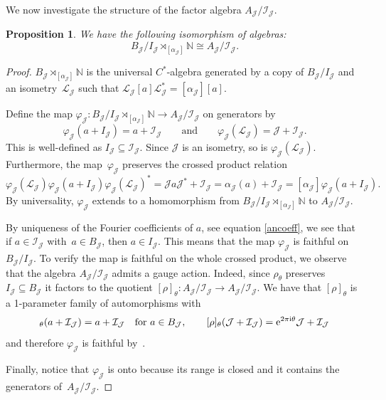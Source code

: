\documentclass[10pt,a4paper]{amsart}
\newcommand{\N}{{\mathbb N}}
\newcommand{\fancyI}{\mathcal{I}}
\newcommand{\fancyJ}{\mathcal{J}}
\newcommand{\fancyL}{\mathcal{L}}
\numberwithin{equation}{section}
\newtheorem{Proposition}[Theorem]{Proposition}
 { \theoremstyle{definition}
\newtheorem{Definition}[Theorem]{Definition}
\newtheorem{Note}[Theorem]{Note}
\newtheorem{Example}[Theorem]{Example}
\newtheorem{Remark}[Theorem]{Remark} }
\begin{document}
We now investigate the structure of the factor algebra $A_\fancyJ/\fancyI_\fancyJ$.
\begin{Proposition}\label{FactorCross}
We have the following isomorphism of algebras:
\begin{equation*}
B_\fancyJ/I_\fancyJ \rtimes_{[\alpha_\fancyJ]} \N \cong A_\fancyJ/\fancyI_\fancyJ.
\end{equation*}
\end{Proposition}
\begin{proof}
$B_\fancyJ \rtimes_{[\alpha_\fancyJ]} \N$ is the universal $C^*$-algebra generated by a copy of $B_\fancyJ/I_\fancyJ$ and an isometry~$\fancyL_\fancyJ$ such that
$
\fancyL_\fancyJ[a]\fancyL_\fancyJ^* = [\alpha_\fancyJ][a]$.


Define the map $\varphi_\fancyJ\colon B_\fancyJ/I_\fancyJ\rtimes_{[\alpha_\fancyJ]}\N \to A_\fancyJ/\fancyI_\fancyJ$ on generators by
\begin{equation*}
\varphi_\fancyJ(a+I_\fancyJ) = a+\fancyI_\fancyJ\qquad\text{and}\qquad \varphi_\fancyJ(\fancyL_\fancyJ) = \fancyJ+\fancyI_\fancyJ.
\end{equation*}
This is well-defined as $I_\fancyJ \subseteq \fancyI_\fancyJ$. Since $\fancyJ$ is an isometry, so is $\varphi_\fancyJ(\fancyL_\fancyJ)$. Furthermore, the map~$\varphi_\fancyJ$ preserves the crossed product relation
\begin{equation*}
\varphi_\fancyJ(\fancyL_\fancyJ)\varphi_\fancyJ(a+I_\fancyJ)\varphi_\fancyJ(\fancyL_\fancyJ)^* = \fancyJ a \fancyJ^* + \fancyI_\fancyJ = \alpha_\fancyJ(a)+\fancyI_\fancyJ = [\alpha_\fancyJ]\varphi_\fancyJ(a+I_\fancyJ).
\end{equation*}
By universality, $\varphi_\fancyJ$ extends to a homomorphism from $B_\fancyJ/I_\fancyJ\rtimes_{[\alpha_\fancyJ]}\N$ to $A_\fancyJ/\fancyI_\fancyJ$.

By uniqueness of the Fourier coefficients of $a$, see equation \eqref{ancoeff}, we see that if $a\in \fancyI_\fancyJ$ with~${a\in B_\fancyJ}$, then $a\in I_\fancyJ$. This means that the map $\varphi_\fancyJ$ is faithful on $B_\fancyJ/I_\fancyJ$. To verify the map is faithful on the whole crossed product, we observe that the algebra $A_\fancyJ/\fancyI_\fancyJ$ admits a gauge action.
Indeed, since $\rho_\theta$ preserves $I_\fancyJ \subseteq B_\fancyJ$ it factors to the quotient $[\rho]_\theta \colon A_\fancyJ/\fancyI_\fancyJ \to A_\fancyJ/\fancyI_\fancyJ$.
We have that $[\rho]_\theta $ is a 1-parameter family of automorphisms with
\begin{equation*}
[\rho]_\theta (a+\fancyI_\fancyJ) = a+\fancyI_\fancyJ \quad \text{for } a\in B_\fancyJ ,\qquad
[\rho]_\theta (\fancyJ+\fancyI_\fancyJ) = {\rm e}^{2\pi {\rm i} \theta}\fancyJ + \fancyI_\fancyJ
\end{equation*}
and therefore $\varphi_\fancyJ$ is faithful by~\cite{BKR}.

Finally, notice that $\varphi_\fancyJ$ is onto because its range is closed and it contains the generators of~$A_\fancyJ/\fancyI_\fancyJ$.
\end{proof}
\end{document}
